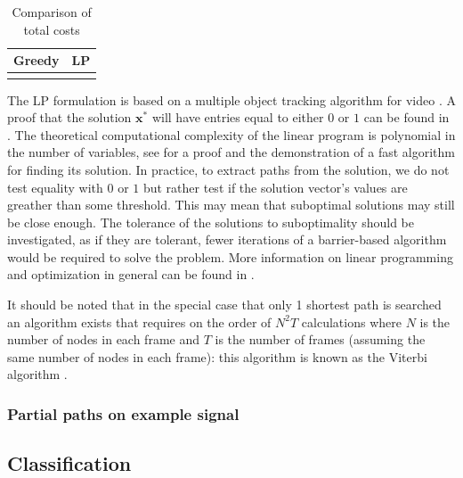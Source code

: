 \documentclass[letterpaper,12pt]{report}
\begin{document}
\begin{table}
    \caption{\label{tab:greedy_lp_cost_compare} Comparison of total costs}
    \begin{center}
        \begin{tabular}{c c}
            Greedy & LP \\
            \hline
             &
             \\
        \end{tabular}
    \end{center}
\end{table}

The LP formulation is based on a multiple object tracking algorithm for video
\cite{jiang2007linear}. A proof that the solution $\boldsymbol{x}^{\ast}$ will
have entries equal to either $0$ or $1$ can be found in
\cite[p.~167]{parker1988discrete}. The theoretical computational complexity of
the linear program is polynomial in the number of variables, see
\cite{karmarkar1984new} for a proof and the demonstration of a fast algorithm
for finding its solution. In practice, to extract paths from the solution, we do
not test equality with $0$ or $1$ but rather test if the solution vector's
values are greather than some threshold. This may mean that suboptimal solutions
may still be close enough. The tolerance of the solutions to suboptimality
should be investigated, as if they are tolerant, fewer iterations of a
barrier-based algorithm would be required to solve the problem. More information
on linear programming and optimization in general can be found in
\cite{boyd2004convex}.

It should be noted that in the special case that only 1 shortest path is
searched an algorithm exists that requires on the order of $N^{2}T$ calculations
\cite{rabiner1989tutorial} where $N$ is the number of nodes in each frame and
$T$ is the number of frames (assuming the same number of nodes in each frame):
this algorithm is known as the Viterbi algorithm \cite{forney1973viterbi}.

\subsubsection{Partial paths on example signal\label{sec:mq_lp_compare_chirp}}

\subsection{Classification}
\end{document}
